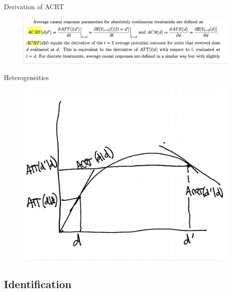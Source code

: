 \documentclass{beamer}
\begin{document}
\begin{frame}{Derivation of ACRT}

\begin{figure}
\begin{center}
             \includegraphics[scale=0.45]{./lecture_includes/continuous2.png}
\end{center}
\end{figure}

\end{frame}
\begin{frame}{Heterogeneities}


\begin{figure}{}
\begin{center}
             \includegraphics[scale=0.4]{./lecture_includes/continuous3.png}
\end{center}
\end{figure}

\end{frame}








\subsection{Identification}
\end{document}
